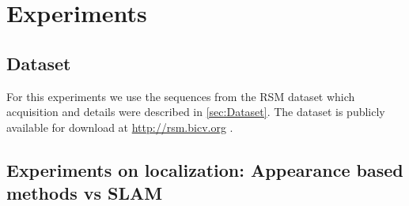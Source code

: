 \section{Experiments}
\label{sec:experiments}

\subsection{Dataset}
For this experiments we use the sequences from the RSM dataset which acquisition and details were described in \ref{sec:Dataset}. The dataset is publicly available for download at \url{http://rsm.bicv.org} \citep{Rivera-RubioRSM}.


\subsection{Experiments on localization: Appearance based methods vs SLAM}


